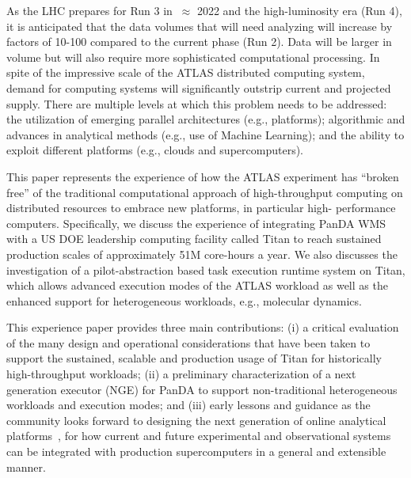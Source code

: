 As the LHC prepares for Run 3 in $~\approx$ 2022 and the high-luminosity era
(Run 4), it is anticipated that the data volumes that will need analyzing
will increase by factors of 10-100 compared to the current phase (Run 2).
Data will be larger in volume but will also require more sophisticated
computational processing. In spite of the impressive scale of the ATLAS
distributed computing system, demand for computing systems will significantly
outstrip current and projected supply.  There are multiple levels at which
this problem needs to be addressed: the utilization of emerging parallel
architectures (e.g., platforms); algorithmic and advances in analytical
methods (e.g., use of Machine Learning); and the ability to exploit different
platforms (e.g., clouds and supercomputers).

This paper represents the experience of how the ATLAS experiment has ``broken
free'' of the traditional computational approach of high-throughput computing
on distributed resources to embrace new platforms, in particular  high-
performance computers. Specifically, we discuss the experience of integrating
PanDA WMS with a US DOE leadership computing facility called Titan to reach
sustained production scales of approximately 51M core-hours a year. We also
discusses the investigation of a pilot-abstraction based task execution
runtime system on Titan, which allows advanced execution modes of the ATLAS
workload as well as the enhanced support for heterogeneous workloads, e.g.,
molecular dynamics.


This experience paper provides three main contributions:  (i) a critical
evaluation of the many design and operational considerations that have been
taken to support the sustained, scalable and production usage of Titan for
historically high-throughput workloads; (ii) a preliminary characterization
of a next generation executor (NGE) for PanDA to support non-traditional
heterogeneous workloads and execution modes;  and (iii) early lessons and
guidance as the community looks forward to designing the next generation of
online analytical platforms~\cite{foap-url}, for how current and future
experimental and observational systems can be integrated with production
supercomputers in a general and extensible manner.
